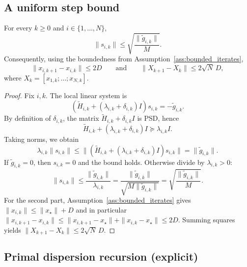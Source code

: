 \documentclass[review,onefignum,onetabnum]{siamart171218}
\begin{document}
	\subsection{A uniform step bound}
	
	\begin{lemma}\label{lem:step_bound_app}
		For every $k\ge0$ and $i\in\{1,\dots,N\}$,
		\[
		\|s_{i,k}\|\le \sqrt{\frac{\|\tilde g_{i,k}\|}{M}}.
		\]
		Consequently, using the boundedness from Assumption~\ref{ass:bounded_iterates},
		\[
		\|x_{i,k+1}-x_{i,k}\|\le 2D
		\qquad\text{and}\qquad
		\|X_{k+1}-X_k\|\le 2\sqrt N\,D,
		\]
		where $X_k=[x_{1,k};\dots;x_{N,k}]$.
	\end{lemma}
	\begin{proof}
		Fix $i,k$. The local linear system is
		\[
		(\tilde H_{i,k}+(\lambda_{i,k}+\delta_{i,k})I)s_{i,k}=-\tilde g_{i,k}.
		\]
		By definition of $\delta_{i,k}$, the matrix $\tilde H_{i,k}+\delta_{i,k}I$ is PSD, hence
		\[
		\tilde H_{i,k}+(\lambda_{i,k}+\delta_{i,k})I \succeq \lambda_{i,k}I.
		\]
		Taking norms, we obtain
		\[
		\lambda_{i,k}\|s_{i,k}\|\le \|(\tilde H_{i,k}+(\lambda_{i,k}+\delta_{i,k})I)s_{i,k}\|=\|\tilde g_{i,k}\|.
		\]
		If $\tilde g_{i,k}=0$, then $s_{i,k}=0$ and the bound holds. Otherwise divide by $\lambda_{i,k}>0$:
		\[
		\|s_{i,k}\|\le \frac{\|\tilde g_{i,k}\|}{\lambda_{i,k}}
		=\frac{\|\tilde g_{i,k}\|}{\sqrt{M\|\tilde g_{i,k}\|}}
		=\sqrt{\frac{\|\tilde g_{i,k}\|}{M}}.
		\]
		For the second part, Assumption~\ref{ass:bounded_iterates} gives $\|x_{i,k}\|\le \|x_\star\|+D$ and in particular
		$\|x_{i,k+1}-x_{i,k}\|\le \|x_{i,k+1}-x_\star\|+\|x_{i,k}-x_\star\|\le 2D$.
		Summing squares yields $\|X_{k+1}-X_k\|\le 2\sqrt N\,D$.
	\end{proof}
	
	\subsection{Primal dispersion recursion (explicit)}
	
\end{document}

